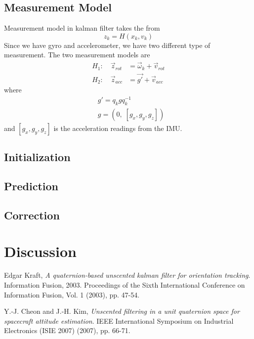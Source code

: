 \documentclass[twoside]{article}
\begin{document}
\begin{multicols}{2}
\subsection{Measurement Model}
Measurement model in kalman filter takes the from
\begin{equation}
z_k = H(x_k, v_k)
\end{equation}
Since we have gyro and accelerometer, we have two different type of measurement. The two measurement models are
\begin{align}
H_1: \quad \vec{z}_{rot} &= \vec{\omega}_k + \vec{v}_{rot} \\
H_2: \quad \vec{z}_{acc} &= \vec{g'} + \vec{v}_{acc} 
\end{align}
where
\begin{align}
&g' = q_k g q_k^{-1} \\
&g  = (0,\;[g_x,g_y,g_z])
\end{align}
and $[g_x,g_y,g_z]$ is the acceleration readings from the IMU.

\subsection{Initialization}
\subsection{Prediction}
\subsection{Correction}


\section{Discussion}


\begin{thebibliography}{2} %

Edgar Kraft, \emph{A quaternion-based unscented kalman filter for orientation tracking}. Information Fusion, 2003. Proceedings of the Sixth International Conference on Information Fusion, Vol. 1 (2003), pp. 47-54.

Y.-J. Cheon and J.-H. Kim, \emph{Unscented filtering in a unit quaternion space for spacecraft attitude estimation}. IEEE International Symposium on Industrial Electronics (ISIE 2007) (2007), pp. 66-71.

\end{thebibliography}


\end{multicols}
\end{document}

